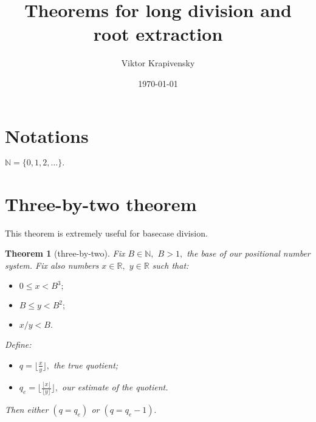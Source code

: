 \documentclass[a4paper,12pt]{article}
\title{Theorems for long division and root extraction}
\author{Viktor Krapivensky}
\date{%
    \today
}
\newtheorem{theorem}{Theorem}
\newcommand{\floor}[1] {\lfloor #1 \rfloor}
\begin{document}
\maketitle

\section{Notations}

$\mathbb{N} = \{0, 1, 2, \ldots\}.$

\section{Three-by-two theorem}

This theorem is extremely useful for basecase division.

\begin{theorem}[three-by-two]
    Fix $B \in \mathbb{N},$ $B > 1,$ the base of our positional number system.
    Fix also numbers $x \in \mathbb{R},$ $y \in \mathbb{R}$ such that:
    \begin{itemize}
      \item $0 \le x < B^3;$
      \item $B \le y < B^2;$
      \item $x/y < B.$
    \end{itemize}
    Define:
    \begin{itemize}
      \item $q = \floor{\frac{x}{y}},$ the true quotient;
      \item $q_e = \floor{\frac{\floor x}{\floor y}},$ our estimate of the quotient.
    \end{itemize}
    Then either $(q = q_e)$ or $(q = q_e - 1).$
\end{theorem}
\end{document}

